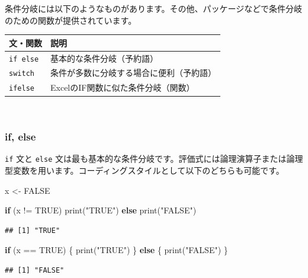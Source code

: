 \documentclass[
  12pt,
]{book}
\newenvironment{Shaded}{\begin{snugshade}}{\end{snugshade}}
\newcommand{\ConstantTok}[1]{\textcolor[rgb]{0.00,0.00,0.00}{#1}}
\newcommand{\ControlFlowTok}[1]{\textcolor[rgb]{0.13,0.29,0.53}{\textbf{#1}}}
\newcommand{\FunctionTok}[1]{\textcolor[rgb]{0.00,0.00,0.00}{#1}}
\newcommand{\NormalTok}[1]{#1}
\newcommand{\OtherTok}[1]{\textcolor[rgb]{0.56,0.35,0.01}{#1}}
\newcommand{\SpecialCharTok}[1]{\textcolor[rgb]{0.00,0.00,0.00}{#1}}
\newcommand{\StringTok}[1]{\textcolor[rgb]{0.31,0.60,0.02}{#1}}
\begin{document}
条件分岐には以下のようなものがあります。その他、パッケージなどで条件分岐のための関数が提供されています。

\begin{longtable}[]{@{}ll@{}}
\toprule
文・関数 & 説明 \\
\midrule
\endhead
\texttt{if\ else} & 基本的な条件分岐（予約語） \\
\texttt{switch} & 条件が多数に分岐する場合に便利（予約語） \\
\texttt{ifelse} & ExcelのIF関数に似た条件分岐（関数） \\
\bottomrule
\end{longtable}

　

\hypertarget{if-else}{%
\subsubsection{if, else}\label{if-else}}

\texttt{if} 文と \texttt{else} 文は最も基本的な条件分岐です。評価式には論理演算子または論理型変数を用います。コーディングスタイルとして以下のどちらも可能です。

\begin{Shaded}
\begin{Highlighting}[]
\NormalTok{x }\OtherTok{\textless{}{-}} \ConstantTok{FALSE}

\ControlFlowTok{if}\NormalTok{ (x }\SpecialCharTok{!=} \ConstantTok{TRUE}\NormalTok{) }\FunctionTok{print}\NormalTok{(}\StringTok{"TRUE"}\NormalTok{) }\ControlFlowTok{else} \FunctionTok{print}\NormalTok{(}\StringTok{"FALSE"}\NormalTok{)}
\end{Highlighting}
\end{Shaded}

\begin{verbatim}
## [1] "TRUE"
\end{verbatim}

\begin{Shaded}
\begin{Highlighting}[]
\ControlFlowTok{if}\NormalTok{ (x }\SpecialCharTok{==} \ConstantTok{TRUE}\NormalTok{) \{}
  \FunctionTok{print}\NormalTok{(}\StringTok{"TRUE"}\NormalTok{)}
\NormalTok{\} }\ControlFlowTok{else}\NormalTok{ \{}
  \FunctionTok{print}\NormalTok{(}\StringTok{"FALSE"}\NormalTok{)}
\NormalTok{\}}
\end{Highlighting}
\end{Shaded}

\begin{verbatim}
## [1] "FALSE"
\end{verbatim}
\end{document}
